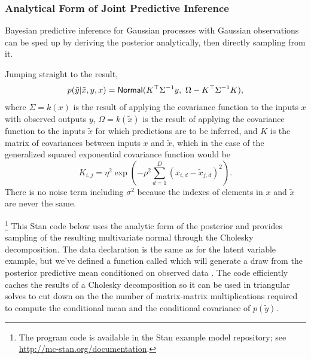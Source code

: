 \subsubsection{Analytical Form of Joint Predictive Inference}

Bayesian predictive inference for Gaussian processes with Gaussian observations
can be sped up by deriving the posterior analytically, then directly sampling
from it.  

Jumping straight to the result,
\[
p(\tilde{y}|\tilde{x},y,x)
= 
\distro{Normal}(K^{\top}\Sigma^{-1}y,\
                \Omega - K^{\top}\Sigma^{-1}K),
\]
where $\Sigma = k(x)$ is the result of applying the covariance
function to the inputs $x$ with observed outputs $y$, $\Omega =
k(\tilde{x})$ is the result of applying the covariance function to the
inputs $\tilde{x}$ for which predictions are to be inferred, and $K$
is the matrix of covariances between inputs $x$ and $\tilde{x}$, which
in the case of the generalized squared exponential covariance function
would be
\[
K_{i, j} = \eta^2 \exp(-\rho^2 \sum_{d=1}^D (x_{i,d} -
\tilde{x}_{j,d})^2).
\]
There is no noise term including $\sigma^2$ because the indexes of
elements in $x$ and $\tilde{x}$ are never the same.

%
\footnote{The program code is available in the Stan example model repository;
see \url{http://mc-stan.org/documentation}.}
%
This Stan code below uses the analytic form of the posterior and provides
sampling of the resulting multivariate normal through the Cholesky
decomposition. The data declaration is the same as for the latent variable
example, but we've defined a function called \code{gp\_pred\_rng} which
will generate a draw from the posterior predictive mean conditioned on
observed data \code{y1}. The code efficiently caches the results of a Cholesky
decomposition so it can be used in triangular solves to cut down on the
the number of matrix-matrix multiplications required to compute the conditional
mean and the conditional covariance of $p(\tilde{y})$.

